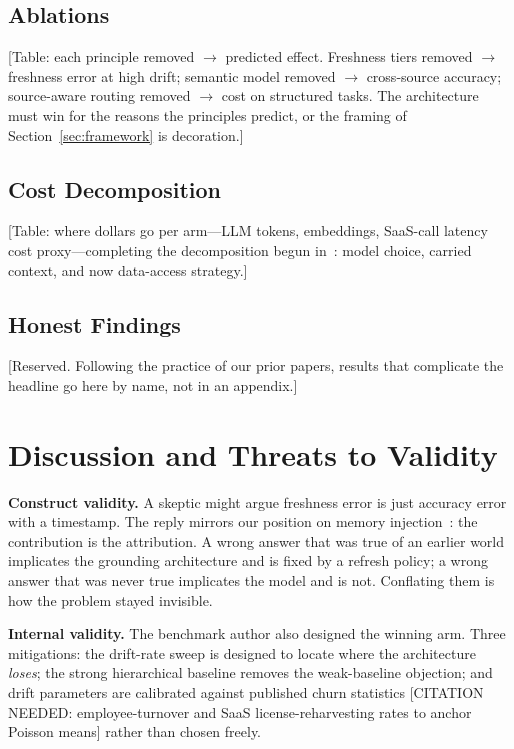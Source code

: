 \documentclass{ieeeaccess}
\begin{document}
\subsection{Ablations}
[Table: each principle removed $\to$ predicted effect. Freshness tiers removed
$\to$ freshness error at high drift; semantic model removed $\to$ cross-source
accuracy; source-aware routing removed $\to$ cost on structured tasks. The
architecture must win for the reasons the principles predict, or the framing
of Section~\ref{sec:framework} is decoration.]

\subsection{Cost Decomposition}
[Table: where dollars go per arm---LLM tokens, embeddings, SaaS-call latency
cost proxy---completing the decomposition begun in~\cite{par, tca}: model
choice, carried context, and now data-access strategy.]

\subsection{Honest Findings}
[Reserved. Following the practice of our prior papers, results that complicate
the headline go here by name, not in an appendix.]

\section{Discussion and Threats to Validity}
\label{sec:threats}

\textbf{Construct validity.} A skeptic might argue freshness error is just
accuracy error with a timestamp. The reply mirrors our position on memory
injection~\cite{tca}: the contribution is the attribution. A wrong answer that
was true of an earlier world implicates the grounding architecture and is fixed
by a refresh policy; a wrong answer that was never true implicates the model
and is not. Conflating them is how the problem stayed invisible.

\textbf{Internal validity.} The benchmark author also designed the winning
arm. Three mitigations: the drift-rate sweep is designed to locate where the
architecture \emph{loses}; the strong hierarchical baseline removes the
weak-baseline objection; and drift parameters are calibrated against published
churn statistics [CITATION NEEDED: employee-turnover and SaaS
license-reharvesting rates to anchor Poisson means] rather than chosen freely.
\end{document}
